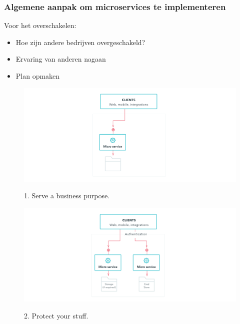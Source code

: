 \documentclass[aspectratio=169]{beamer}
\begin{document}
\begin{frame}
	\frametitle{Algemene aanpak om microservices te implementeren}
	Voor het overschakelen:
	\begin{itemize}
		\item Hoe zijn andere bedrijven overgeschakeld?
		\item Ervaring van anderen nagaan
		\item Plan opmaken
	\end{itemize}

\end{frame}

\begin{frame}
	\begin{figure}
		\caption{1. Serve a business purpose.}
		\includegraphics[height=.8\textheight]{img/1.png}
		\label{img:serveABusinessPurpose}
	\end{figure}
\end{frame}

\begin{frame}
	\begin{figure}
		\caption{2. Protect your stuff.}
		\includegraphics[height=.8\textheight]{img/2.png}
		\label{img:protectYourStuff}
	\end{figure}
\end{frame}
\end{document}
